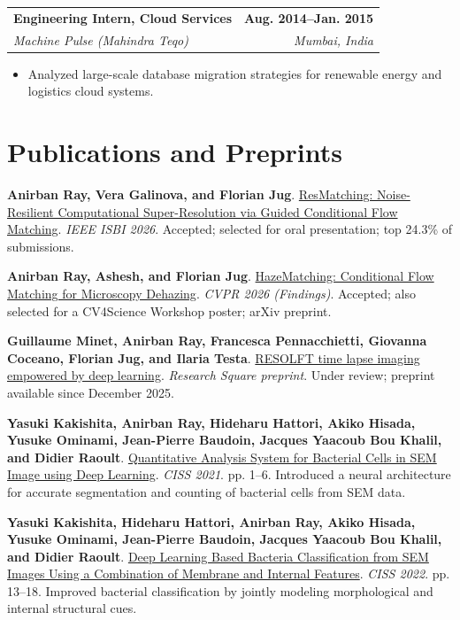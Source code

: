 \documentclass[11pt,a4paper]{article}
\makeatletter
\newcommand{\entry}[4]{%
  \begin{tabularx}{\linewidth}{@{}>{\raggedright\arraybackslash}X r@{}}
    \textbf{#1} & \textbf{#2} \\
    \textit{#3} & \textit{#4}
  \end{tabularx}\vspace{-2pt}
}
\newcommand{\paper}[4]{%
  \item \textbf{#1}. #2. \textit{#3}. #4
}
\makeatother
\begin{document}
\entry{Engineering Intern, Cloud Services}{Aug. 2014--Jan. 2015}{Machine Pulse (Mahindra Teqo)}{Mumbai, India}
\begin{itemize}
  \item Analyzed large-scale database migration strategies for renewable energy and logistics cloud systems.
\end{itemize}

\section*{Publications and Preprints}
\begin{enumerate}[label={[\arabic*]}]
  \paper{\textbf{Anirban Ray}, Vera Galinova, and Florian Jug}{\href{https://arxiv.org/abs/2510.26601}{ResMatching: Noise-Resilient Computational Super-Resolution via Guided Conditional Flow Matching}}{IEEE ISBI 2026}{Accepted; selected for oral presentation; top 24.3\% of submissions.}
  \paper{\textbf{Anirban Ray}, Ashesh, and Florian Jug}{\href{https://arxiv.org/abs/2506.22397}{HazeMatching: Conditional Flow Matching for Microscopy Dehazing}}{CVPR 2026 (Findings)}{Accepted; also selected for a CV4Science Workshop poster; arXiv preprint.}
  \paper{Guillaume Minet, \textbf{Anirban Ray}, Francesca Pennacchietti, Giovanna Coceano, Florian Jug, and Ilaria Testa}{\href{https://www.researchsquare.com/article/rs-8059028/v1}{RESOLFT time lapse imaging empowered by deep learning}}{Research Square preprint}{Under review; preprint available since December 2025.}
  \paper{Yasuki Kakishita, \textbf{Anirban Ray}, Hideharu Hattori, Akiko Hisada, Yusuke Ominami, Jean-Pierre Baudoin, Jacques Yaacoub Bou Khalil, and Didier Raoult}{\href{https://ieeexplore.ieee.org/abstract/document/9400322}{Quantitative Analysis System for Bacterial Cells in SEM Image using Deep Learning}}{CISS 2021}{pp. 1--6. Introduced a neural architecture for accurate segmentation and counting of bacterial cells from SEM data.}
  \paper{Yasuki Kakishita, Hideharu Hattori, \textbf{Anirban Ray}, Akiko Hisada, Yusuke Ominami, Jean-Pierre Baudoin, Jacques Yaacoub Bou Khalil, and Didier Raoult}{\href{https://ieeexplore.ieee.org/abstract/document/9751170}{Deep Learning Based Bacteria Classification from SEM Images Using a Combination of Membrane and Internal Features}}{CISS 2022}{pp. 13--18. Improved bacterial classification by jointly modeling morphological and internal structural cues.}
\end{enumerate}
\end{document}
